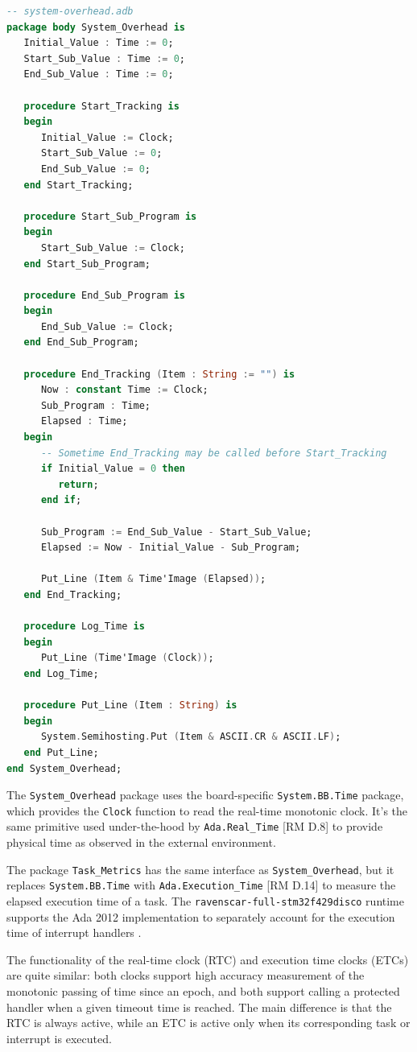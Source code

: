 \documentclass{article}
\begin{document}
\begin{lstlisting}[language=Ada]
-- system-overhead.adb
package body System_Overhead is
   Initial_Value : Time := 0;
   Start_Sub_Value : Time := 0;
   End_Sub_Value : Time := 0;

   procedure Start_Tracking is
   begin
      Initial_Value := Clock;
      Start_Sub_Value := 0;
      End_Sub_Value := 0;
   end Start_Tracking;

   procedure Start_Sub_Program is
   begin
      Start_Sub_Value := Clock;
   end Start_Sub_Program;

   procedure End_Sub_Program is
   begin
      End_Sub_Value := Clock;
   end End_Sub_Program;

   procedure End_Tracking (Item : String := "") is
      Now : constant Time := Clock;
      Sub_Program : Time;
      Elapsed : Time;
   begin
      -- Sometime End_Tracking may be called before Start_Tracking
      if Initial_Value = 0 then
         return;
      end if;

      Sub_Program := End_Sub_Value - Start_Sub_Value;
      Elapsed := Now - Initial_Value - Sub_Program;

      Put_Line (Item & Time'Image (Elapsed));
   end End_Tracking;

   procedure Log_Time is
   begin
      Put_Line (Time'Image (Clock));
   end Log_Time;

   procedure Put_Line (Item : String) is
   begin
      System.Semihosting.Put (Item & ASCII.CR & ASCII.LF);
   end Put_Line;
end System_Overhead;
\end{lstlisting}

The \texttt{System\_Overhead} package uses the board-specific \texttt{System.BB.Time} package, which provides the \texttt{Clock} function to read the real-time monotonic clock. It's the same primitive used under-the-hood by \texttt{Ada.Real\_Time} [RM D.8] to provide physical time as observed in the external environment.

The package \texttt{Task\_Metrics} has the same interface as \texttt{System\_Overhead}, but it replaces \texttt{System.BB.Time} with \texttt{Ada.Execution\_Time} [RM D.14] to measure the elapsed execution time of a task. The \texttt{ravenscar-full-stm32f429disco} runtime supports the Ada 2012 implementation to separately account for the execution time of interrupt handlers \cite{etc}.

The functionality of the real-time clock (RTC) and execution time clocks (ETCs) are quite similar: both clocks support high accuracy measurement of the monotonic passing of time since an epoch, and both support calling a protected handler when a given timeout time is reached. The main difference is that the RTC is always active, while an ETC is active only when its corresponding task or interrupt is executed.
\end{document}
